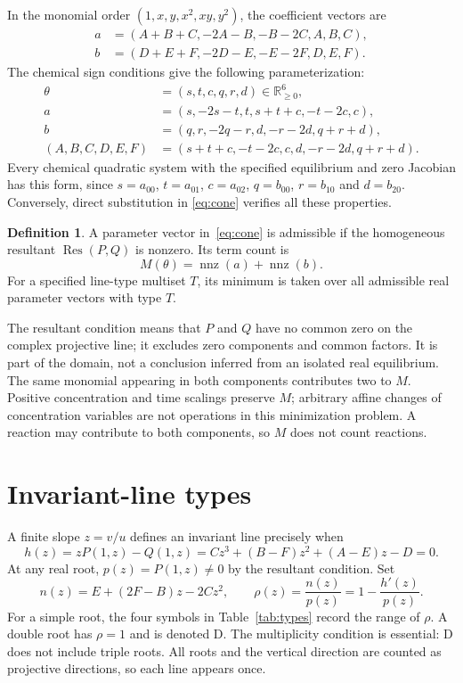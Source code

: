 \documentclass[11pt,a4paper]{article}
\theoremstyle{definition}\newtheorem{definition}[theorem]{Definition}
\newcommand{\DD}{\mathrm D}
\newcommand{\Res}{\operatorname{Res}}
\newcommand{\nnz}{\operatorname{nnz}}
\begin{document}
In the monomial order $(1,x,y,x^2,xy,y^2)$, the coefficient vectors are
\begin{align}
 a&=(A+B+C,-2A-B,-B-2C,A,B,C),\nonumber\\
 b&=(D+E+F,-2D-E,-E-2F,D,E,F).\label{eq:original}
\end{align}
The chemical sign conditions give the following parameterization:
\begin{equation}\label{eq:cone}
\begin{split}
 \theta&=(s,t,c,q,r,d)\in\mathbb R_{\geq0}^{6},\\
 a&=(s,-2s-t,t,s+t+c,-t-2c,c),\\
 b&=(q,r,-2q-r,d,-r-2d,q+r+d),\\
 (A,B,C,D,E,F)&=(s+t+c,-t-2c,c,d,-r-2d,q+r+d).
\end{split}
\end{equation}
Every chemical quadratic system with the specified equilibrium and zero
Jacobian has this form, since $s=a_{00}$, $t=a_{01}$, $c=a_{02}$,
$q=b_{00}$, $r=b_{10}$ and $d=b_{20}$. Conversely, direct substitution in
\eqref{eq:cone} verifies all these properties.

\begin{definition}\label{def:domain}
A parameter vector in~\eqref{eq:cone} is admissible if the homogeneous
resultant $\Res(P,Q)$ is nonzero. Its term count is
\[
 M(\theta)=\nnz(a)+\nnz(b).
\]
For a specified line-type multiset $T$, its minimum is taken over all
admissible real parameter vectors with type $T$.
\end{definition}
The resultant condition means that $P$ and $Q$ have no common zero on the
complex projective line; it excludes zero components and common factors.
It is part of the domain, not a conclusion inferred from an isolated real
equilibrium. The same monomial appearing in both components contributes two
to $M$. Positive concentration and time scalings preserve $M$; arbitrary
affine changes of concentration variables are not operations in this
minimization problem. A reaction may contribute to both components, so
$M$ does not count reactions.

\section{Invariant-line types}\label{sec:lines}
A finite slope $z=v/u$ defines an invariant line precisely when
\begin{equation}\label{eq:h}
 h(z)=zP(1,z)-Q(1,z)=Cz^3+(B-F)z^2+(A-E)z-D=0.
\end{equation}
At any real root, $p(z)=P(1,z)\ne0$ by the resultant condition. Set
\begin{equation}\label{eq:rho}
 n(z)=E+(2F-B)z-2Cz^2,\qquad
 \rho(z)=\frac{n(z)}{p(z)}=1-\frac{h'(z)}{p(z)}.
\end{equation}
For a simple root, the four symbols in Table~\ref{tab:types} record the
range of $\rho$. A double root has $\rho=1$ and is denoted $\DD$.
The multiplicity condition is essential: $\DD$ does not include triple
roots. All roots and the vertical direction are counted as projective
directions, so each line appears once.
\end{document}

